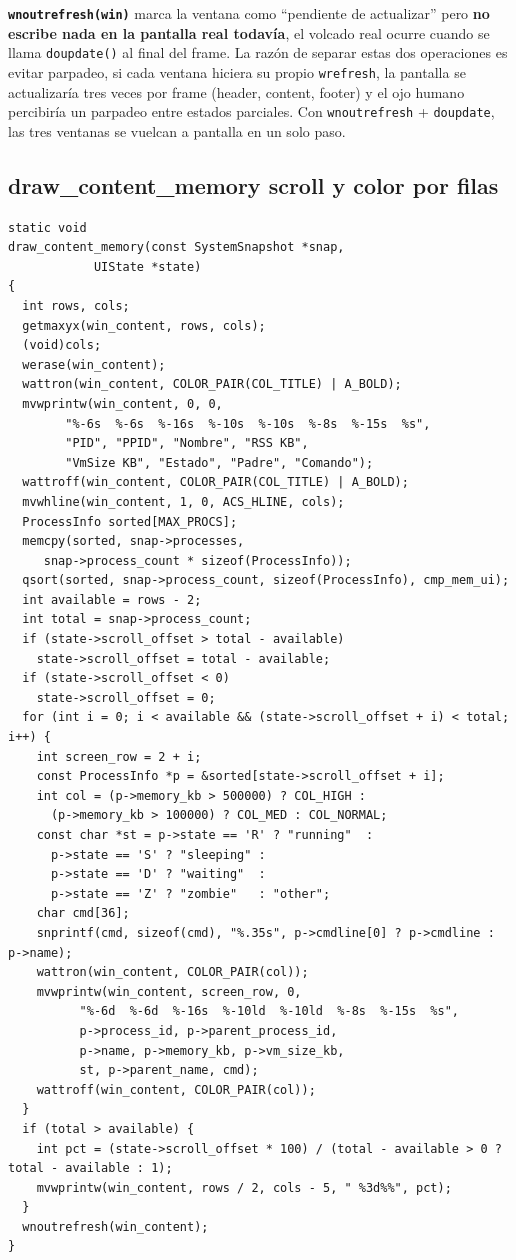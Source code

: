 \documentclass[12pt,letterpaper]{article}
\begin{document}
\textbf{\texttt{wnoutrefresh(win)}} marca la ventana como ``pendiente de actualizar'' pero
\textbf{no escribe nada en la pantalla real todavía}, el volcado real ocurre cuando se llama
\texttt{doupdate()} al final del frame. La razón de separar estas dos operaciones es evitar parpadeo, si cada
ventana hiciera su propio \texttt{wrefresh}, la pantalla se actualizaría tres veces por frame
(header, content, footer) y el ojo humano percibiría un parpadeo entre estados parciales.
Con \texttt{wnoutrefresh} + \texttt{doupdate}, las tres ventanas se vuelcan a pantalla en un solo paso.

\subsection*{draw\_content\_memory scroll y color por filas}

\begin{lstlisting}[style=modernc, caption={\texttt{ui.c} draw\_content\_memory()}]
static void
draw_content_memory(const SystemSnapshot *snap,
		    UIState *state)
{
  int rows, cols;
  getmaxyx(win_content, rows, cols);
  (void)cols;
  werase(win_content);
  wattron(win_content, COLOR_PAIR(COL_TITLE) | A_BOLD);
  mvwprintw(win_content, 0, 0,
	    "%-6s  %-6s  %-16s  %-10s  %-10s  %-8s  %-15s  %s",
	    "PID", "PPID", "Nombre", "RSS KB",
	    "VmSize KB", "Estado", "Padre", "Comando");
  wattroff(win_content, COLOR_PAIR(COL_TITLE) | A_BOLD);
  mvwhline(win_content, 1, 0, ACS_HLINE, cols);
  ProcessInfo sorted[MAX_PROCS];
  memcpy(sorted, snap->processes,
	 snap->process_count * sizeof(ProcessInfo));
  qsort(sorted, snap->process_count, sizeof(ProcessInfo), cmp_mem_ui);
  int available = rows - 2;
  int total = snap->process_count;
  if (state->scroll_offset > total - available)
    state->scroll_offset = total - available;
  if (state->scroll_offset < 0)
    state->scroll_offset = 0;
  for (int i = 0; i < available && (state->scroll_offset + i) < total; i++) {
    int screen_row = 2 + i;
    const ProcessInfo *p = &sorted[state->scroll_offset + i];
    int col = (p->memory_kb > 500000) ? COL_HIGH :
      (p->memory_kb > 100000) ? COL_MED : COL_NORMAL;
    const char *st = p->state == 'R' ? "running"  :
      p->state == 'S' ? "sleeping" :
      p->state == 'D' ? "waiting"  :
      p->state == 'Z' ? "zombie"   : "other";
    char cmd[36];
    snprintf(cmd, sizeof(cmd), "%.35s", p->cmdline[0] ? p->cmdline : p->name);
    wattron(win_content, COLOR_PAIR(col));
    mvwprintw(win_content, screen_row, 0,
	      "%-6d  %-6d  %-16s  %-10ld  %-10ld  %-8s  %-15s  %s",
	      p->process_id, p->parent_process_id,
	      p->name, p->memory_kb, p->vm_size_kb,
	      st, p->parent_name, cmd);
    wattroff(win_content, COLOR_PAIR(col));
  }
  if (total > available) {
    int pct = (state->scroll_offset * 100) / (total - available > 0 ? total - available : 1);
    mvwprintw(win_content, rows / 2, cols - 5, " %3d%%", pct);
  }
  wnoutrefresh(win_content);
}
\end{lstlisting}
\end{document}

